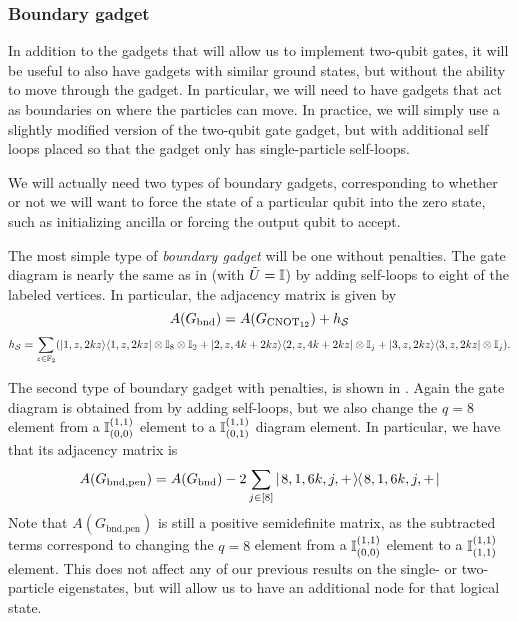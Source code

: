 \documentclass[../thesis-main/thesis-main]{subfiles}
\begin{document}

\subsubsection{Boundary gadget}

In addition to the gadgets that will allow us to implement two-qubit gates, it will be useful to also have gadgets with similar ground states, but without the ability to move through the gadget.  In particular, we will need to have gadgets that act as boundaries on where the particles can move.  In practice, we will simply use a slightly modified version of the two-qubit gate gadget, but with additional self loops placed so that the gadget only has single-particle self-loops.  

We will actually need two types of boundary gadgets, corresponding to whether or not we will want to force the state of a particular qubit into the zero state, such as initializing ancilla or forcing the output qubit to accept.

The most simple type of \emph{boundary gadget} will be one without penalties.  The gate diagram is nearly the same as in  (with $\tilde U = \mathbb{I}$) by adding self-loops to eight of the labeled vertices.  In particular, the adjacency matrix is given by
\begin{equation}
  A(G_{\text{bnd}})=A(G_{\mathrm{CNOT}_{12}})+h_{\mathcal{S}} 
\end{equation}
\begin{equation}
  h_{\mathcal{S}}
  =\sum_{z\in\mathbb{F}_2}(
    |1,z, 2k z \rangle\langle1,z, 2k z |\otimes\mathbb{I}_{8}\otimes \mathbb{I}_{2}
   +|2,z,4k + 2kz\rangle\langle2,z, 4 k + 2 k z|\otimes\mathbb{I}_{j}
   +|3,z,2k z\rangle\langle3,z,2kz|\otimes\mathbb{I}_{j}
  ).
\end{equation}

The second type of boundary gadget with penalties, is shown in .  Again the gate diagram is obtained from  by adding self-loops, but we also change the $q=8$ element from a  $\mathbb{I}_{(0,0)}^{(1,1)}$ element to a $\mathbb{I}_{(0,1)}^{(1,1)}$ diagram element.  In particular, we have that its adjacency matrix is
\begin{equation}
  A(G_{\text{bnd,pen}})=A(G_{\text{bnd}}) - 2\sum_{j\in[8]} |\mspace{2mu} 8,1,6k,j,+ \mspace{2mu} \rangle\mspace{-2mu}\langle\mspace{2mu} 8,1, 6k,j,+ \mspace{2mu} |
\end{equation}
Note that $A(G_{\text{bnd,pen}})$ is still a positive semidefinite matrix, as the subtracted terms correspond to changing the $q=8$ element from a $\mathbb{I}_{(0,0)}^{(1,1)}$ element to a $\mathbb{I}_{(1,1)}^{(1,1)}$ element.  This does not affect any of our previous results on the single- or two- particle eigenstates, but will allow us to have an additional node for that logical state.
\end{document}
